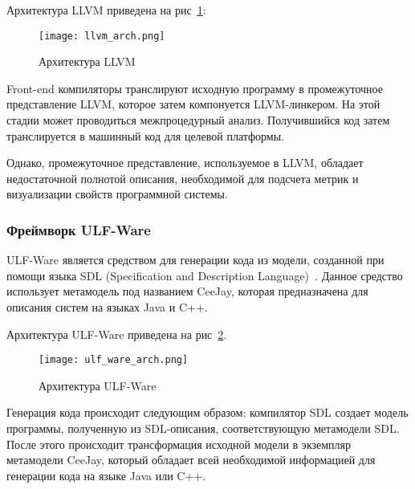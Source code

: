 Архитектура LLVM приведена на рис~\ref{fig:llvm_arch}:

\begin{figure}[ht!]
    \begin{center}
        \texttt{[image: llvm\_arch.png]}
    \end{center}
    \caption{Архитектура LLVM}
    \label{fig:llvm_arch}
\end{figure}

Front-end компиляторы транслируют исходную программу в промежуточное
представление LLVM, которое затем компонуется LLVM-линкером. На этой стадии
может проводиться межпроцедурный анализ. Получившийся код затем транслируется
в машинный код для целевой платформы.

Однако, промежуточное представление, используемое в LLVM, обладает
недостаточной полнотой описания, необходимой для подсчета метрик и визуализации
свойств программной системы.

\subsubsection{Фреймворк ULF-Ware}



ULF-Ware является средством для генерации кода из модели, созданной при помощи
языка SDL (Specification and Description Language)~\cite{metamodeling}. Данное
средство использует метамодель под названием CeeJay, которая предназначена для
описания систем на языках Java и C++.

Архитектура ULF-Ware приведена на рис~\ref{fig:ulf_ware_arch}.

\begin{figure}[htbc!]
    \begin{center}
        \texttt{[image: ulf\_ware\_arch.png]}
    \end{center}
    \caption{Архитектура ULF-Ware}
    \label{fig:ulf_ware_arch}
\end{figure}

Генерация кода происходит следующим образом: компилятор SDL создает модель
программы, полученную из SDL-описания, соответствующую метамодели SDL. После
этого происходит трансформация исходной модели в экземпляр метамодели CeeJay,
который обладает всей необходимой информацией для генерации кода на языке Java
или C++.

